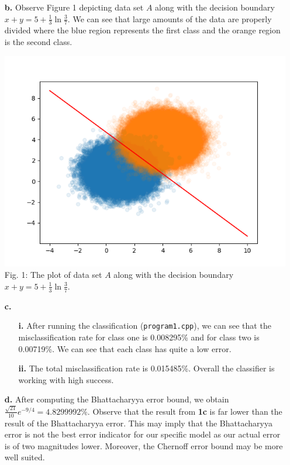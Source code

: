 \documentclass[ 12pt ]{article}
\begin{document}
\begin{enumerate}
\begin{enumerate}
            \item[\textbf{b.}] Observe Figure 1 depicting data set $A$ along with the decision boundary $x+y = 5 + \frac{1}{3}\ln \frac{3}{7}$. We can see that large amounts of the data
                are properly divided where the blue region represents the first class and the orange region is the second class.
                \begin{center}
                    \includegraphics{figure1}
                    \scriptsize
                    Fig. 1: The plot of data set $A$ along with the decision boundary $x+y = 5 + \frac{1}{3}\ln \frac{3}{7}$.
                \end{center}

            \item[\textbf{c.}]
                \begin{enumerate}
                    \item[\textbf{i.}] After running the classification (\verb|program1.cpp|), we can see that the misclassification rate for class one is 0.008295\% and for class
                        two is 0.00719\%. We can see that each class has quite a low error.
                    \item[\textbf{ii.}] The total misclassification rate is 0.015485\%. Overall the classifier is working with high success.
                \end{enumerate}

            \item[\textbf{d.}] After computing the Bhattacharyya error bound, we obtain $\frac{\sqrt{21}}{10}e^{-9/4} = 4.8299992\%$. Observe that the result from \textbf{1c} is far
                lower than the result of the Bhattacharyya error. This may imply that the Bhattacharyya error is not the best error indicator for our specific model as our actual
                error is of two magnitudes lower. Moreover, the Chernoff error bound may be more well suited.
        \end{enumerate}


\end{enumerate}
\end{document}
